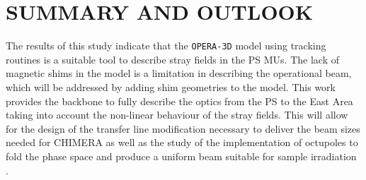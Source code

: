 \documentclass[a4paper,
               biblatex,     %
               keeplastbox,   %
               ]{jacow}
\begin{document}


\section{SUMMARY AND OUTLOOK}

The results of this study indicate that the \texttt{OPERA-3D} model using tracking routines is a suitable tool to describe stray fields in the PS MUs. The lack of magnetic shims in the model is a limitation in describing the operational beam, which will be addressed by adding shim geometries to the model. This work provides the backbone to fully describe the optics from the PS to the East Area taking into account the non-linear behaviour of the stray fields. This will allow for the design of the transfer line modification necessary to deliver the beam sizes needed for CHIMERA as well as the study of the implementation of octupoles to fold the phase space and produce a uniform beam suitable for sample irradiation \cite{tsoupas_uniform_2007-1}.



\printbibliography
\end{document}
